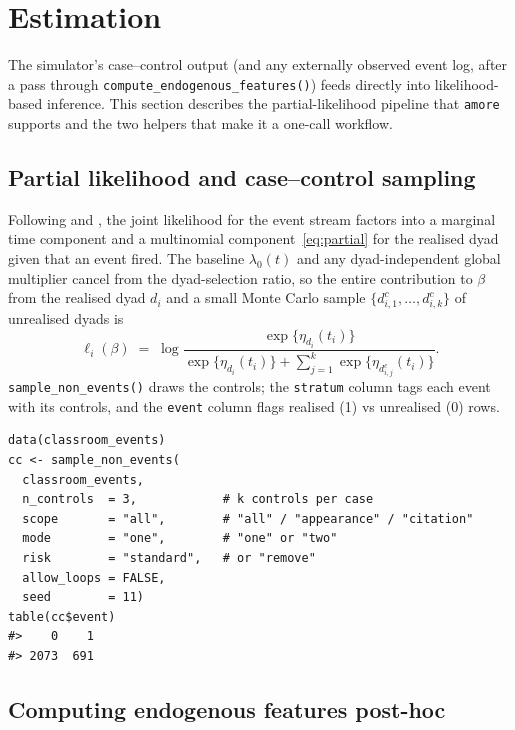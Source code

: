 \documentclass[11pt,a4paper]{article}
\begin{document}
\section{Estimation}\label{sec:estimation}

The simulator's case--control output (and any externally observed
event log, after a pass through
\texttt{compute\_endogenous\_features()}) feeds directly into
likelihood-based inference. This section describes the
partial-likelihood pipeline that \texttt{amore} supports and the
two helpers that make it a one-call workflow.

\subsection{Partial likelihood and case--control sampling}
\label{sec:est-partial}

Following \citet{perry2013point} and \citet{vu2017relational}, the
joint likelihood for the event stream factors into a marginal time
component and a multinomial component~\eqref{eq:partial} for the
realised dyad given that an event fired. The baseline
$\lambda_0(t)$ and any dyad-independent global multiplier cancel
from the dyad-selection ratio, so the entire contribution to
$\beta$ from the realised dyad $d_i$ and a small Monte Carlo
sample $\{d_{i,1}^c, \dots, d_{i,k}^c\}$ of unrealised dyads is
\begin{equation*}
  \ell_i(\beta)
  \;=\;
  \log \frac{\exp\{\eta_{d_i}(t_i)\}}
  {\exp\{\eta_{d_i}(t_i)\} + \sum_{j=1}^k \exp\{\eta_{d_{i,j}^c}(t_i)\}}.
\end{equation*}
\texttt{sample\_non\_events()} draws the controls; the
\texttt{stratum} column tags each event with its controls, and
the \texttt{event} column flags realised (1) vs unrealised (0)
rows.

\begin{lstlisting}
data(classroom_events)
cc <- sample_non_events(
  classroom_events,
  n_controls  = 3,            # k controls per case
  scope       = "all",        # "all" / "appearance" / "citation"
  mode        = "one",        # "one" or "two"
  risk        = "standard",   # or "remove"
  allow_loops = FALSE,
  seed        = 11)
table(cc$event)
#>    0    1
#> 2073  691
\end{lstlisting}

\subsection{Computing endogenous features post-hoc}
\label{sec:est-features}
\end{document}
